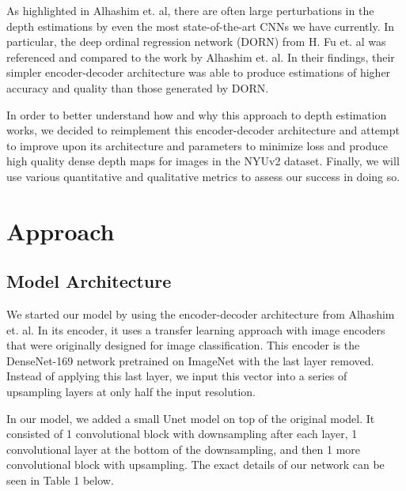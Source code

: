 \documentclass[10pt,twocolumn,letterpaper]{article}
\begin{document}
As highlighted in Alhashim et. al, there are often large perturbations in the
depth estimations by even the most state-of-the-art CNNs we have currently.
In particular, the deep ordinal regression network (DORN) from H. Fu et. al was
referenced and compared to the work by Alhashim et. al. In their findings, their
simpler encoder-decoder architecture was able to produce estimations of higher
accuracy and quality than those generated by DORN.

In order to better understand how and why this approach to depth estimation
works, we decided to reimplement this encoder-decoder architecture and attempt
to improve upon its architecture and parameters to minimize loss and produce
high quality dense depth maps for images in the NYUv2 dataset. Finally, we will
use various quantitative and qualitative metrics to assess our success in doing
so.


\section{Approach}
\label{sec:appr}

\subsection{Model Architecture}

We started our model by using the encoder-decoder architecture from
Alhashim et. al. In its encoder, it uses a transfer learning approach with image
encoders that were originally designed for image classification. This encoder
is the DenseNet-169 network pretrained on ImageNet with the last layer removed.
Instead of applying this last layer, we input this vector into a series of
upsampling layers at only half the input resolution.

In our model, we added a small Unet model on top of the original model. It
consisted of 1 convolutional block with downsampling after each layer,
1 convolutional layer at the bottom of the downsampling, and then 1 more
convolutional block with upsampling. The exact details of our network can be
seen in Table 1 below.
\end{document}
